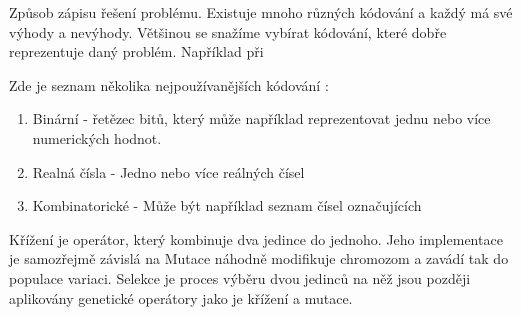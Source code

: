 Způsob zápisu řešení problému. Existuje mnoho různých kódování a každý má své výhody a nevýhody. Většinou se snažíme vybírat kódování, které dobře reprezentuje daný problém. Například při 


Zde je seznam několika nejpoužívanějších kódování \cite[s.~42-43]{geneticCZ}:
\begin{enumerate}
	\item Binární - řetězec bitů, který může například reprezentovat jednu nebo více numerických hodnot. 
	\item Realná čísla - Jedno nebo více reálných čísel
	\item Kombinatorické - Může být například seznam čísel označujících 
\end{enumerate}
Křížení je operátor, který kombinuje dva jedince do jednoho. Jeho implementace je samozřejmě závislá na 
Mutace náhodně modifikuje chromozom a zavádí tak do populace variaci.
Selekce je proces výběru dvou jedinců na něž jsou později aplikovány genetické operátory jako je křížení a mutace.  
